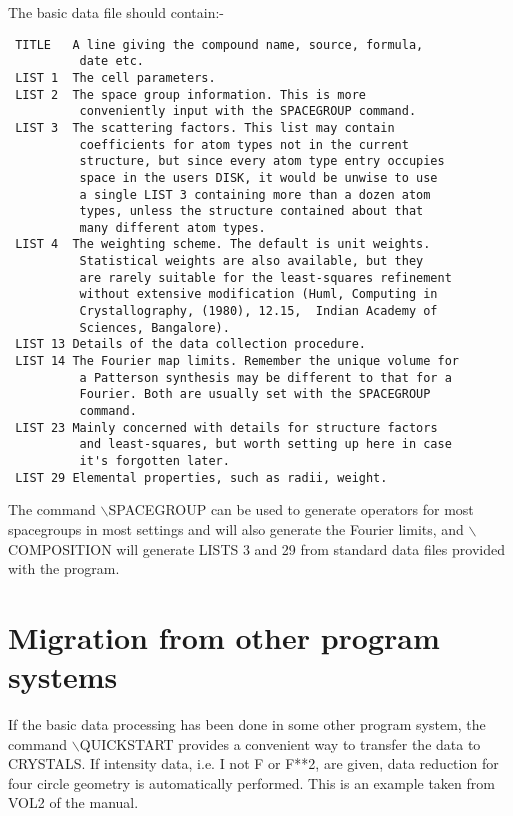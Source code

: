 \documentclass[10pt,a4paper]{report}
\begin{document}
 The basic data file should contain:-
\small\begin{verbatim}
 TITLE   A line giving the compound name, source, formula, 
          date etc.
 LIST 1  The cell parameters. 
 LIST 2  The space group information. This is more 
          conveniently input with the SPACEGROUP command.
 LIST 3  The scattering factors. This list may contain 
          coefficients for atom types not in the current 
          structure, but since every atom type entry occupies 
          space in the users DISK, it would be unwise to use
          a single LIST 3 containing more than a dozen atom 
          types, unless the structure contained about that 
          many different atom types.
 LIST 4  The weighting scheme. The default is unit weights.
          Statistical weights are also available, but they
          are rarely suitable for the least-squares refinement 
          without extensive modification (Huml, Computing in 
          Crystallography, (1980), 12.15,  Indian Academy of 
          Sciences, Bangalore). 
 LIST 13 Details of the data collection procedure.
 LIST 14 The Fourier map limits. Remember the unique volume for
          a Patterson synthesis may be different to that for a 
          Fourier. Both are usually set with the SPACEGROUP 
          command.
 LIST 23 Mainly concerned with details for structure factors 
          and least-squares, but worth setting up here in case 
          it's forgotten later.
 LIST 29 Elemental properties, such as radii, weight.
\end{verbatim}\normalsize




The command $\backslash$SPACEGROUP can be used to generate operators for most
 spacegroups in most settings and will also generate the Fourier limits,
 and $\backslash$COMPOSITION will generate LISTS 3 and 29
 from standard data files provided with the program.

\section{Migration from other program systems}





If the basic data processing has been done in some other program system,
 the command $\backslash$QUICKSTART provides a convenient way to transfer the data to
 CRYSTALS. If intensity
 data, i.e. I not F or F**2, are given, data reduction for four circle
 geometry is automatically performed.
  This is an example taken from VOL2 of the manual.
\end{document}
